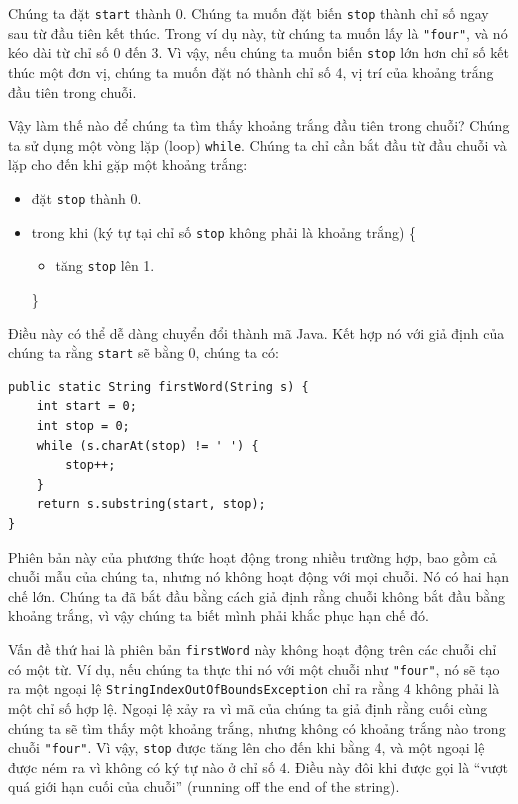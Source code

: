 Chúng ta đặt \texttt{start} thành 0. Chúng ta muốn đặt biến \texttt{stop} thành chỉ số ngay sau từ đầu tiên kết thúc. Trong ví dụ này, từ chúng ta muốn lấy là \texttt{"four"}, và nó kéo dài từ chỉ số 0 đến 3. Vì vậy, nếu chúng ta muốn biến \texttt{stop} lớn hơn chỉ số kết thúc một đơn vị, chúng ta muốn đặt nó thành chỉ số 4, vị trí của khoảng trắng đầu tiên trong chuỗi.

Vậy làm thế nào để chúng ta tìm thấy khoảng trắng đầu tiên trong chuỗi? Chúng ta sử dụng một vòng lặp (loop) \texttt{while}. Chúng ta chỉ cần bắt đầu từ đầu chuỗi và lặp cho đến khi gặp một khoảng trắng:
\begin{itemize}
    \item đặt \texttt{stop} thành 0.
    \item trong khi (ký tự tại chỉ số \texttt{stop} không phải là khoảng trắng) \{
    \begin{itemize}
        \item tăng \texttt{stop} lên 1.
    \end{itemize}
    \}
\end{itemize}

Điều này có thể dễ dàng chuyển đổi thành mã Java. Kết hợp nó với giả định của chúng ta rằng \texttt{start} sẽ bằng 0, chúng ta có:

\begin{verbatim}
public static String firstWord(String s) {
    int start = 0;
    int stop = 0;
    while (s.charAt(stop) != ' ') {
        stop++;
    }
    return s.substring(start, stop);
}
\end{verbatim}

Phiên bản này của phương thức hoạt động trong nhiều trường hợp, bao gồm cả chuỗi mẫu của chúng ta, nhưng nó không hoạt động với mọi chuỗi. Nó có hai hạn chế lớn. Chúng ta đã bắt đầu bằng cách giả định rằng chuỗi không bắt đầu bằng khoảng trắng, vì vậy chúng ta biết mình phải khắc phục hạn chế đó.

Vấn đề thứ hai là phiên bản \texttt{firstWord} này không hoạt động trên các chuỗi chỉ có một từ. Ví dụ, nếu chúng ta thực thi nó với một chuỗi như \texttt{"four"}, nó sẽ tạo ra một ngoại lệ \texttt{StringIndex\allowbreak{}OutOfBounds\allowbreak{}Exception} chỉ ra rằng 4 không phải là một chỉ số hợp lệ. Ngoại lệ xảy ra vì mã của chúng ta giả định rằng cuối cùng chúng ta sẽ tìm thấy một khoảng trắng, nhưng không có khoảng trắng nào trong chuỗi \texttt{"four"}. Vì vậy, \texttt{stop} được tăng lên cho đến khi bằng 4, và một ngoại lệ được ném ra vì không có ký tự nào ở chỉ số 4. Điều này đôi khi được gọi là ``vượt quá giới hạn cuối của chuỗi'' (running off the end of the string).

